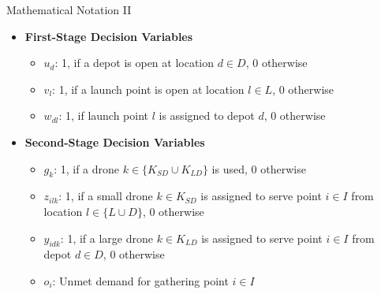 \documentclass[aspectratio=169]{beamer}
\begin{document}
\begin{frame}{Mathematical Notation II}
    \begin{itemize}
        \item \textbf{First-Stage Decision Variables}
        \begin{itemize}
            \item $u_d$: 1, if a depot is open at location $d \in D$, 0 otherwise
            \item $v_l$: 1, if a launch point is open at location $l \in L$, 0 otherwise
            \item $w_{dl}$: 1, if launch point $l$ is assigned to depot $d$, 0 otherwise
        \end{itemize}
        \item \textbf{Second-Stage Decision Variables}
        \begin{itemize}
            \item $g_k$: 1, if a drone $k \in \{K_{SD} \cup K_{LD}\}$ is used, 0 otherwise
            \item $z_{ilk}$: 1, if a small drone $k \in K_{SD}$ is assigned to serve point $i \in I$ from location $l \in \{L \cup D\}$, 0 otherwise
            \item $y_{idk}$: 1, if a large drone $k \in K_{LD}$ is assigned to serve point $i \in I$ from depot $d \in D$, 0 otherwise
            \item $o_i$: Unmet demand for gathering point $i \in I$
        \end{itemize}
    \end{itemize}
\end{frame}
\end{document}
